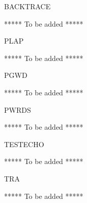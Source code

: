 \begin{Switch}[backtrace]{BACKTRACE}

***** To be added *****

\end{Switch}




\begin{Switch}[plap]{PLAP}

***** To be added *****

\end{Switch}


\begin{Switch}[pgwd]{PGWD}

***** To be added *****

\end{Switch}


\begin{Switch}[pwrds]{PWRDS}

***** To be added *****

\end{Switch}


\begin{Switch}[testecho]{TESTECHO}

***** To be added *****

\end{Switch}


\begin{Switch}[tra]{TRA}

***** To be added *****

\end{Switch}


